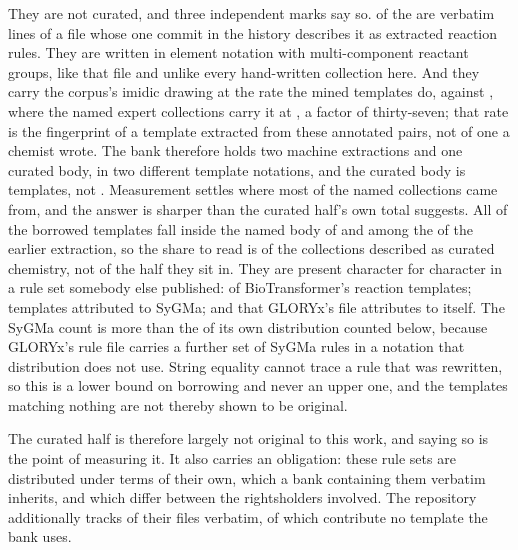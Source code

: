 \documentclass[journal=jcisd8,manuscript=suppinfo,layout=onecolumn]{achemso}
\begin{document}
They are not curated, and three independent marks say so. \numAttribPlaced{} of the
\numAttribUnattributed{} are verbatim lines of a file whose one commit in the history describes
it as extracted reaction rules. They are written in element notation with multi-component
reactant groups, like that file and unlike every hand-written collection here. And they carry the
corpus's imidic drawing at the rate the mined templates do, \numAttribUnattributedimidic{}
against \numAttribMinedimidic{}, where the named expert collections carry it at
\numAttribNamedimidic{}, a factor of thirty-seven; that rate is the fingerprint of a template
extracted from these annotated pairs, not of one a chemist wrote.
The bank therefore holds two machine extractions and one curated body, in two different template
notations, and the curated body is \numAttribNamed{} templates, not \numCuratedTotal{}.
Measurement settles where most of the named collections came from, and the answer is sharper
than the curated half's own total suggests. All
\numThirdpartyInnamed{} of the borrowed templates fall inside the named body of
\numThirdpartyNamed{} and \numThirdpartyInextractionWord{} among the
\numAttribUnattributed{} of the earlier extraction, so the share to read is
\numThirdpartyNamedsharePct{} of the collections described as curated chemistry, not
\numThirdpartyTraceablesharePct{} of the half they sit in. They are present character for
character in a rule set somebody else published: \numThirdpartyBiotransformerShipped{} of
BioTransformer's \numThirdpartyBiotransformerRead{} reaction templates;
\numThirdpartySygmaShipped{} templates attributed to SyGMa; and
\numThirdpartyGloryxShipped{} that GLORYx's file attributes to itself. The SyGMa count is more
than the \numSygmaInside{} of its own distribution counted below, because GLORYx's rule file
carries a further set of SyGMa rules in a notation that distribution does not use. String equality
cannot trace a rule that was rewritten, so this is a lower bound on borrowing and never an upper
one, and the \numThirdpartyUntraceable{} templates matching nothing are not thereby shown to be
original.

The curated half is therefore largely not original to this work, and saying so is the point of
measuring it. It also carries an obligation: these rule sets are distributed under terms of their
own, which a bank containing them verbatim inherits, and which differ between the
\numThirdpartyHoldersWord{} rightsholders involved. The repository additionally tracks
\numThirdpartyFilesWord{} of their files verbatim, \numThirdpartyFilesunusedWord{} of which
contribute no template the bank uses.
\end{document}
